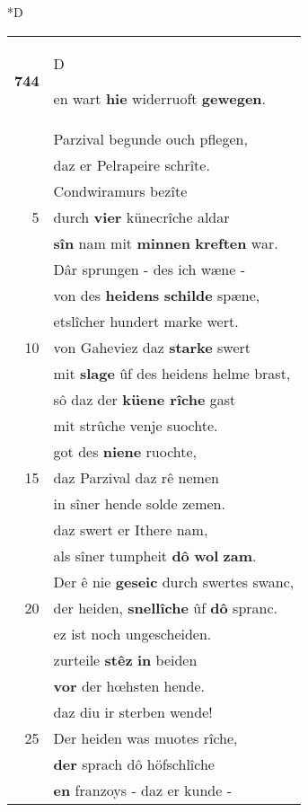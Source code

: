 \documentclass[8pt,a4paper,notitlepage]{article}
\begin{document}
\begin{table}[ht]
\begin{minipage}[t]{0.5\linewidth}
\small
\begin{center}*D
\end{center}
\begin{tabular}{rl}
\textbf{744} & \begin{large}D\end{large}en wart \textbf{hie} widerruoft \textbf{gewegen}.\\ 
 & Parzival begunde ouch pflegen,\\ 
 & daz er Pelrapeire schrîte.\\ 
 & Condwiramurs bezîte\\ 
5 & durch \textbf{vier} künecrîche aldar\\ 
 & \textbf{sîn} nam mit \textbf{minnen} \textbf{kreften} war.\\ 
 & Dâr sprungen - des ich wæne -\\ 
 & von des \textbf{heidens} \textbf{schilde} spæne,\\ 
 & etslîcher hundert marke wert.\\ 
10 & von Gaheviez daz \textbf{starke} swert\\ 
 & mit \textbf{slage} ûf des heidens helme brast,\\ 
 & sô daz der \textbf{küene rîche} gast\\ 
 & mit strûche venje suochte.\\ 
 & got des \textbf{niene} ruochte,\\ 
15 & daz Parzival daz rê nemen\\ 
 & in sîner hende solde zemen.\\ 
 & daz swert er Ithere nam,\\ 
 & als sîner tumpheit \textbf{dô} \textbf{wol} \textbf{zam}.\\ 
 & Der ê nie \textbf{geseic} durch swertes swanc,\\ 
20 & der heiden, \textbf{snellîche} ûf \textbf{dô} spranc.\\ 
 & ez ist noch ungescheiden.\\ 
 & zurteile \textbf{stêz} \textbf{in} beiden\\ 
 & \textbf{vor} der hœhsten hende.\\ 
 & daz diu ir sterben wende!\\ 
25 & Der heiden was muotes rîche,\\ 
 & \textbf{der} sprach dô höfschlîche\\ 
 & \textbf{en} franzoys - daz er kunde -\\ 

\end{tabular}
\end{minipage}
\end{table}
\end{document}
